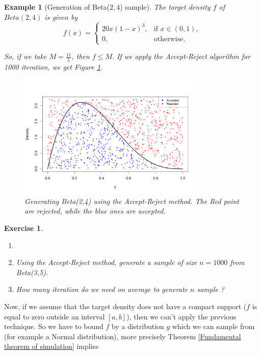 \documentclass{article}\usepackage[]{graphicx}\usepackage[]{xcolor}
\newtheorem{exercise}{Exercise}
\newtheorem{example}{Example}
\begin{document}
\begin{example}[Generation of Beta($2,4$) sample] The target density $f$ of $Beta(2,4)$ is given by 
\begin{equation}\label{Target_density_Beta}
f(x) =
\begin{cases} 
20 x(1-x)^3, & \text{if } x \in (0,1), \\ 
0, & \text{otherwise}.
\end{cases}
\end{equation}

So, if we take $M=\frac{11}{5}$, then $f\leq M.$ If we apply the Accept-Reject algorithm  for 1000 iteration, we get Figure \ref{fig:GeneratingBetaDistr}.

\begin{figure}[h]
    \centering
    \includegraphics[width=0.8\textwidth]{Figures/Accept-Reject generation of a Beta sample.png}
    \caption{Generating Beta(2,4) using the Accept-Reject method. The Red point are rejected, while the blue ones are accepted.}
    \label{fig:GeneratingBetaDistr}
\end{figure}

\end{example}

\begin{exercise}
\begin{enumerate}
\item[]
\item Using the \textit{Accept-Reject} method, generate a sample of size $n = 1000$ from Beta(3,5).
\item How many iteration do we need on average to generate $n$ sample ?
\end{enumerate}
\end{exercise}

Now, if we assume that the target density does not have a compact support ($f$ is equal to zero outside an interval $[a,b]$), then we can't apply the previous technique. So we have to bound $f$ by a distribution $g$ which we can sample from (for example a Normal distribution), more precisely Theorem \ref{Fundamental theorem of simulation} implies 
\end{document}
